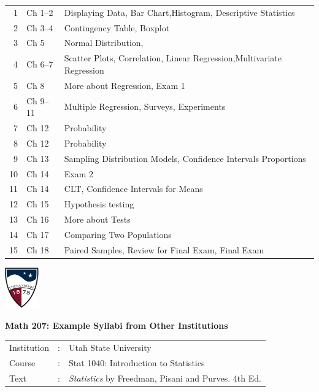 \documentclass[10pt]{article}
\begin{document}
\begin{tabular}{rll}
1 &	Ch 1--2 & Displaying Data, Bar Chart,Histogram, Descriptive Statistics\\
2 & 	Ch 3--4 &	Contingency Table, Boxplot\\
3 &	Ch 5 	& Normal Distribution,\\
4 & 	Ch 6--7 &	Scatter Plots, Correlation, Linear Regression,Multivariate Regression\\
5 &	Ch 8 	& More about Regression, Exam 1\\
6 &	Ch 9--11 &	Multiple Regression, Surveys, Experiments\\
7 &	Ch 12 	& Probability\\
8 &	Ch 12 	& Probability\\
9 &	Ch 13 	& Sampling Distribution Models, Confidence Intervals Proportions\\
10 &	Ch 14 	& Exam 2\\
11 &	Ch 14 	& CLT, Confidence Intervals for Means\\
12 &	Ch 15 	& Hypothesis testing\\
13 &	Ch 16 	& More about Tests\\
14 &	Ch 17 	& Comparing Two Populations\\
15 &	Ch 18 	& Paired Samples, Review for Final Exam, Final Exam
\end{tabular}

\vfill
\eject
\href{http://www.su.edu}{\includegraphics[height=1.75cm]{sulogo.eps}}
\vspace{-1.69cm}


\begin{center}
  \textbf{\large Math 207: Example Syllabi from Other Institutions}
\bigskip\bigskip
\end{center}


\begin{tabular}{lcl}
Institution & : & Utah State University\\
Course      & : & Stat 1040:  Introduction to Statistics\\
Text        & : & \textit{Statistics} by Freedman, Pisani and Purves.  4th Ed.
\end{tabular}
\bigskip
\end{document}
